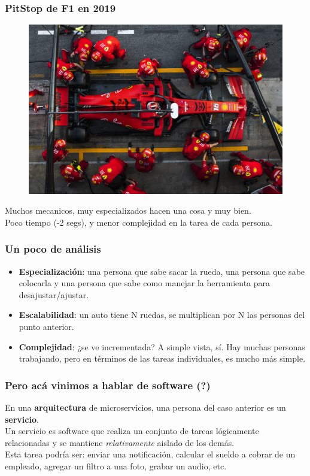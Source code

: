 \documentclass{beamer}
\begin{document}
\begin{frame}
	\frametitle{PitStop de F1 en 2019}
	\begin{figure}[htp]
	\centering
	\includegraphics[scale=0.25]{img/f1-ahora.jpeg}
	\end{figure}

	Muchos mecanicos, muy especializados hacen una cosa y muy bien. \\
	Poco tiempo (-2 segs), y menor complejidad en la tarea de cada persona.
\end{frame}

\begin{frame}
    \frametitle{Un poco de análisis}
    \begin{itemize}
    	\item \textbf{Especialización}: una persona que sabe sacar la rueda, una persona que sabe colocarla y una persona que sabe como manejar la herramienta para desajustar/ajustar.
		\item \textbf{Escalabilidad}: un auto tiene N ruedas, se multiplican por N las personas del punto anterior.
		\item \textbf{Complejidad}: ¿se ve incrementada? A simple vista, sí. Hay muchas personas trabajando, pero en términos de las tareas individuales, es mucho más simple.
    \end{itemize}
\end{frame}

\begin{frame}
    \frametitle{Pero acá vinimos a hablar de software (?)}
	En una \textbf{arquitectura} de microservicios, una persona del caso anterior es un \textbf{servicio}. \\
	Un servicio es software que realiza un conjunto de tareas lógicamente relacionadas y se mantiene \emph{relativamente} aislado de los demás. \\
	Esta tarea podría ser: enviar una notificación, calcular el sueldo a cobrar de un empleado, agregar un filtro a una foto, grabar un audio, etc.
\end{frame}
\end{document}
